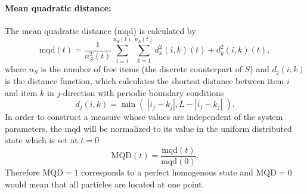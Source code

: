 \paragraph{Mean quadratic distance:} The mean quadratic distance (mqd) is calculated by
%
\begin{equation}
	\text{mqd}(t) = \frac{1}{n_S^2(t)}\sum_{i=1}^{n_S(t)}\sum_{k=1}^{n_S(t)}d_x^2(i,k)(t)+d_y^2(i,k)(t),
\label{eq:mqd}
\end{equation}
%
where $n_S$ is the number of free items (the discrete counterpart of $S$) and $d_j(i,k)$ is the distance function, which calculates the shortest distance between item $i$ and item $k$ in $j$-direction with periodic boundary conditions
%
\begin{equation}
	d_j(i,k) = \min\left(\;\left|i_j-k_j\right|,L-\left|i_j-k_j\right|\;\right).
\label{eq:d_molecule}
\end{equation}
%
In order to construct a measure whose values are independent of the system parameters, the mqd will be normalized to its value in the uniform distributed state which is set at $t=0$
%
\begin{equation}
	\text{MQD}(t) = \frac{\text{mqd}(t)}{\text{mqd}(0)}.
\label{eq:MQD}
\end{equation}
%
Therefore $\text{MQD}=1$ corresponds to a perfect homogenous state and $\text{MQD}=0$ would mean that all particles are located at one point.

